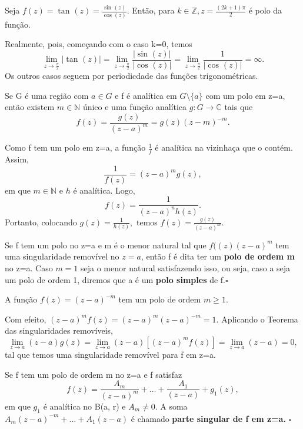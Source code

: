 \documentclass[ComplexAnalysis/complex.tex]{subfiles}
\begin{document}
\begin{example}
	Seja \(f(z) = \tan^{}{(z)} = \frac{\sin^{}{(z)}}{\cos^{}{(z)}}.\) Então, para \(k\in \mathbb{Z}, z = \frac{(2k+1)\pi }{2}\) é polo da função.

	Realmente, pois, começando com o caso k=0, temos
	\[
		\lim_{z\to \frac{\pi }{2}}|\tan^{}{(z)}| = \lim_{z\to \frac{\pi }{2}}\frac{|\sin^{}{(z)}|}{|\cos^{}{(z)}|} = \lim_{z\to \frac{\pi }{2}} \frac{1}{|\cos^{}{(z)}|} = \infty.
	\]
	Os outros casos seguem por periodicdade das funções trigonométricas.
\end{example}
\begin{prop*}
	Se G é uma região com \(a\in G\) e f é analítica em \(G\setminus{\{a\}}\) com um polo em z=a, então existem \(m\in \mathbb{N}\) único e uma função
	analítica \(g:G\rightarrow \mathbb{C}\) tais que
	\[
		f(z) = \frac{g(z)}{(z-a)^{m}} = g(z)(z-m)^{-m}.
	\]
\end{prop*}
\begin{proof*}
	Como f tem um polo em z=a, a função \(\frac{1}{f}\) é analítica na vizinhaça que o contém. Assim,
	\[
		\frac{1}{f(z)} = (z-a)^{m}g(z),
	\]
	em que \(m\in \mathbb{N}\) e \(h\) é analítica. Logo,
	\[
		f(z) = \frac{1}{(z-a)^{n}h(z)}.
	\]
	Portanto, colocando \(g(z) = \frac{1}{h(z)},\) temos \(f(z) = \frac{g(z)}{(z-a)^{m}}.\) \qedsymbol
\end{proof*}
\begin{def*}
	Se f tem um polo no z=a e m é o menor natural tal que \(f((z)(z-a)^{m}\) tem uma singularidade removível no \(z=a\), então f é dita ter
	um \textbf{polo de ordem m} no z=a. Caso \(m=1\) seja o menor natural satisfazendo isso, ou seja, caso a seja um polo de ordem 1, diremos que a é um \textbf{polo simples} de f.\(\square\)
\end{def*}
\begin{example}
	A função \(f(z) = (z-a)^{-m}\) tem um polo de ordem \(m\geq 1.\)

	Com efeito, \((z-a)^{m}f(z) = (z-a)^{m}(z-a)^{-m} = 1.\) Aplicando o Teorema das singularidades removíveis,
	\[
		\lim_{z\to a}(z-a)g(z)=\lim_{z\to a}(z-a)[(z-a)^{m}f(z)] = \lim_{z\to a}(z-a)=0,
	\]
	tal que temos uma singularidade removível para f em z=a.
\end{example}
\begin{def*}
	Se f tem um polo de ordem m no z=a e f satisfaz
	\[
		f(z) = \frac{A_{m}}{(z-a)^{m}}+\dotsc +\frac{A_{1}}{(z-a)} + g_{1}(z),
	\]
	em que \(g_{1}\) é analítica no B(a, r) e \(A_{m}\neq0\). A soma \(A_{m}(z-a)^{-m}+\dotsc +A_{1}(z-a)\) é chamado
	\textbf{parte singular de f em z=a.} \(\square\)
\end{def*}
\end{document}
